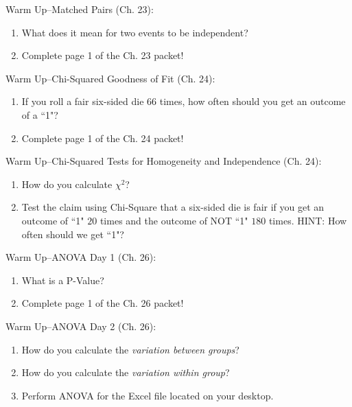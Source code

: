 \documentclass[12pt]{amsart}
\theoremstyle{definition}
\begin{document}
    \begin{framed}
      Warm Up--Matched Pairs (Ch. 23):
      \begin{enumerate}
      \item What does it mean for two events to be independent?
      \item Complete page 1 of the Ch. 23 packet!
      \end{enumerate}
      \end{framed}
      
      \begin{framed}
            Warm Up--Chi-Squared Goodness of Fit (Ch. 24):
            \begin{enumerate}
            \item If you roll a fair six-sided die $66$ times, how often should you get an outcome of a ``1"?
            \item Complete page 1 of the Ch. 24 packet!
            \end{enumerate}
            \end{framed}
            
\begin{framed}
      Warm Up--Chi-Squared Tests for Homogeneity and Independence (Ch. 24):
      \begin{enumerate}
      \item How do you calculate $\chi^2$?
      \item Test the claim using Chi-Square that a six-sided die is fair if you get an outcome of ``1" $20$ times and the outcome of NOT ``1" $180$ times. HINT: How often should we get ``1"?
       \end{enumerate}
      \end{framed}

   \begin{framed}
      Warm Up--ANOVA Day 1 (Ch. 26):
      \begin{enumerate}
      \item What is a P-Value?
      \item Complete page 1 of the Ch. 26 packet!
      \end{enumerate}
      \end{framed}
      
      \newpage
   \begin{framed}
      Warm Up--ANOVA Day 2 (Ch. 26):
      \begin{enumerate}
      \item How do you calculate the \emph{variation between groups}?
      \item How do you calculate the \emph{variation within group}?
      \item Perform ANOVA for the Excel file located on your desktop.
      \end{enumerate}
      \end{framed}
      
\end{document}

